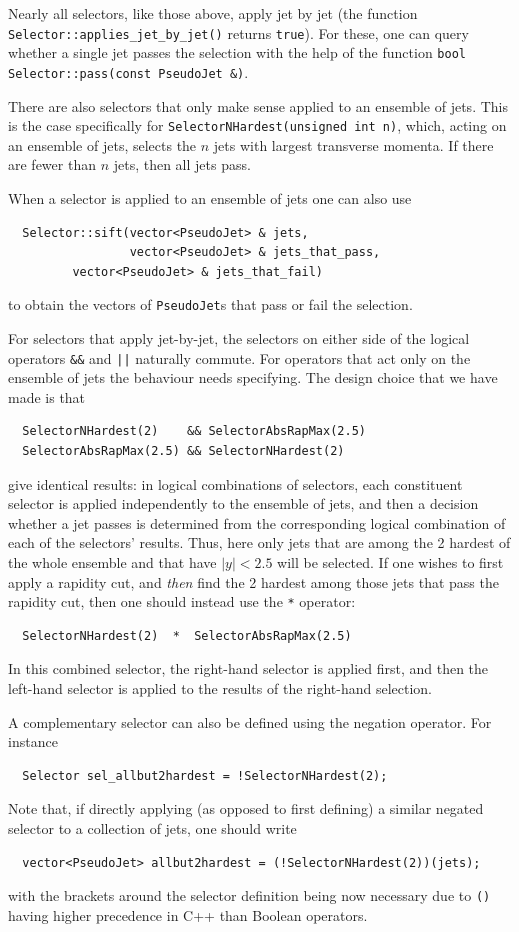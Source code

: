 \documentclass[12pt,a4]{article}
\newcommand{\ttt}[1]{{\small\texttt{#1}}}
\begin{document}
Nearly all selectors, like those above, apply jet by jet (the function
\ttt{Selector::applies\_jet\_by\_jet()} returns \ttt{true}). 
%
For these, one can
query whether a single jet passes the selection with the help of the
function \ttt{bool Selector::pass(const PseudoJet \&)}.

There are also selectors that only make sense applied to an ensemble
of jets. 
%
This is the case specifically for \ttt{SelectorNHardest(unsigned
  int n)}, which, acting on an ensemble of jets, selects the $n$ jets with
largest transverse momenta. If there are fewer than $n$ jets, then all
jets pass.

When a selector is applied to an ensemble of jets one can also use
\begin{lstlisting}
  Selector::sift(vector<PseudoJet> & jets, 
                 vector<PseudoJet> & jets_that_pass, 
		 vector<PseudoJet> & jets_that_fail)		 
\end{lstlisting}
to obtain the vectors of \ttt{PseudoJet}s that pass or fail the selection.

For selectors that apply jet-by-jet, the selectors on either
side of the logical operators \ttt{\&\&} and \ttt{||} naturally
commute.
%
For operators that act only on the ensemble of jets the behaviour needs
specifying. 
%
The design choice that we have made is that
\begin{lstlisting}
  SelectorNHardest(2)    && SelectorAbsRapMax(2.5)
  SelectorAbsRapMax(2.5) && SelectorNHardest(2)
\end{lstlisting}
give identical results: in logical combinations of selectors, each
constituent selector is applied independently to the ensemble of jets,
and then a decision whether a jet passes is determined from the
corresponding logical combination of each of the selectors'
results. Thus, here only jets that are among the 2 hardest of the
whole ensemble and that have $|y|<2.5$ will be selected.
%
If one wishes to first apply a rapidity cut, and {\sl then} find the 2
hardest among those jets that pass the rapidity cut, then one should
instead use the \ttt{*} operator:
\begin{lstlisting}
  SelectorNHardest(2)  *  SelectorAbsRapMax(2.5)
\end{lstlisting}
In this combined selector, the right-hand selector is applied first,
and then the left-hand selector is applied to the results of the
right-hand selection.

A complementary selector can also be defined using the negation operator. For
instance
\begin{lstlisting}
  Selector sel_allbut2hardest = !SelectorNHardest(2);
\end{lstlisting}
Note that, if directly applying (as opposed to first defining) a similar 
negated selector to a collection
of jets, one should write
\begin{lstlisting}
  vector<PseudoJet> allbut2hardest = (!SelectorNHardest(2))(jets);
\end{lstlisting}
with the brackets around the selector definition being now necessary due to
\ttt{()} having higher precedence in C++ than Boolean operators.
\end{document}
